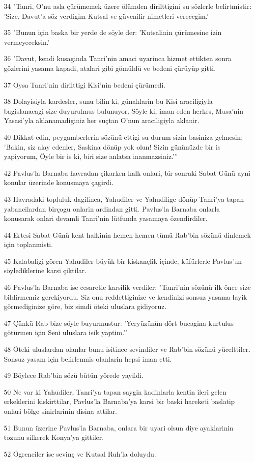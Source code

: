 \par 34 "Tanri, O'nu asla çürümemek üzere ölümden dirilttigini su sözlerle belirtmistir: 'Size, Davut'a söz verdigim Kutsal ve güvenilir nimetleri verecegim.'
\par 35 "Bunun için baska bir yerde de söyle der: 'Kutsalinin çürümesine izin vermeyeceksin.'
\par 36 "Davut, kendi kusaginda Tanri'nin amaci uyarinca hizmet ettikten sonra gözlerini yasama kapadi, atalari gibi gömüldü ve bedeni çürüyüp gitti.
\par 37 Oysa Tanri'nin dirilttigi Kisi'nin bedeni çürümedi.
\par 38 Dolayisiyla kardesler, sunu bilin ki, günahlarin bu Kisi araciligiyla bagislanacagi size duyurulmus bulunuyor. Söyle ki, iman eden herkes, Musa'nin Yasasi'yla aklanamadiginiz her suçtan O'nun araciligiyla aklanir.
\par 40 Dikkat edin, peygamberlerin sözünü ettigi su durum sizin basiniza gelmesin: 'Bakin, siz alay edenler, Saskina dönüp yok olun! Sizin gününüzde bir is yapiyorum, Öyle bir is ki, biri size anlatsa inanmazsiniz.'"
\par 42 Pavlus'la Barnaba havradan çikarken halk onlari, bir sonraki Sabat Günü ayni konular üzerinde konusmaya çagirdi.
\par 43 Havradaki topluluk dagilinca, Yahudiler ve Yahudilige dönüp Tanri'ya tapan yabancilardan birçogu onlarin ardindan gitti. Pavlus'la Barnaba onlarla konusarak onlari devamli Tanri'nin lütfunda yasamaya özendirdiler.
\par 44 Ertesi Sabat Günü kent halkinin hemen hemen tümü Rab'bin sözünü dinlemek için toplanmisti.
\par 45 Kalabaligi gören Yahudiler büyük bir kiskançlik içinde, küfürlerle Pavlus'un söylediklerine karsi çiktilar.
\par 46 Pavlus'la Barnaba ise cesaretle karsilik verdiler: "Tanri'nin sözünü ilk önce size bildirmemiz gerekiyordu. Siz onu reddettiginize ve kendinizi sonsuz yasama layik görmediginize göre, biz simdi öteki uluslara gidiyoruz.
\par 47 Çünkü Rab bize söyle buyurmustur: 'Yeryüzünün dört bucagina kurtulus götürmen için Seni uluslara isik yaptim.'"
\par 48 Öteki uluslardan olanlar bunu isitince sevindiler ve Rab'bin sözünü yücelttiler. Sonsuz yasam için belirlenmis olanlarin hepsi iman etti.
\par 49 Böylece Rab'bin sözü bütün yörede yayildi.
\par 50 Ne var ki Yahudiler, Tanri'ya tapan saygin kadinlarla kentin ileri gelen erkeklerini kiskirttilar, Pavlus'la Barnaba'ya karsi bir baski hareketi baslatip onlari bölge sinirlarinin disina attilar.
\par 51 Bunun üzerine Pavlus'la Barnaba, onlara bir uyari olsun diye ayaklarinin tozunu silkerek Konya'ya gittiler.
\par 52 Ögrenciler ise sevinç ve Kutsal Ruh'la doluydu.

